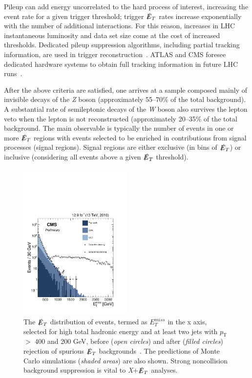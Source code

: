 \documentclass{ar-1col}
\newcommand{\pt}{\ensuremath{p_\mathrm{T}}\xspace}
\newcommand{\MET}{\ensuremath{\slashed{E}_T}\xspace}
\begin{document}
{\begin{textbox}
Pileup can add energy uncorrelated to the hard process of interest, increasing the event
rate for a given trigger threshold; trigger \MET rates increase
exponentially with the number of additional interactions. For this
reason, increases in LHC instantaneous luminosity and data set size
come at the cost of increased thresholds. Dedicated pileup
suppression algorithms, including partial tracking information, are
used in trigger
reconstruction~\cite{CMS:2014ata,ATLAS-CONF-2014-019}. ATLAS and
CMS foresee dedicated hardware systems to obtain full tracking
information in future LHC
runs~\cite{Shochet:2013gaw,1748-0221-6-12-C12065}.
\end{textbox}

After the above criteria are satisfied, one arrives at a sample composed mainly
of invisible decays of the \textit{Z} boson (approximately 55--70\% of the
total background). A substantial rate of semileptonic decays of
the \textit{W} boson also survives the lepton veto when the lepton is not
reconstructed (approximately 20--35\% of the total background.
The main observable is typically the number of events in one or
more \MET regions with events selected to be enriched in contributions from signal processes (signal regions). 
Signal regions are either exclusive (in bins of
\MET) or inclusive (considering all events above a given \MET
threshold).

\begin{figure}[!htpb]
\includegraphics[width=0.5\textwidth]{figures/FakeMET}
\caption{The \MET distribution of events, termed as $E_T^{miss}$ in the x axis, selected for high total
hadronic energy and at least two jets with \pt{} $>$ 400 and 200
GeV, before (\textit{open circles}) and after (\textit{filled circles}) rejection of
spurious \MET backgrounds~\cite{CMS-PAS-JME-16-004}. The
predictions of Monte Carlo  simulations (\textit{shaded areas}) are also shown. Strong
noncollision background suppression is vital to \textit{X}+\MET analyses.}
\label{fig:fakeMET}
\end{figure}

}
\end{document}
